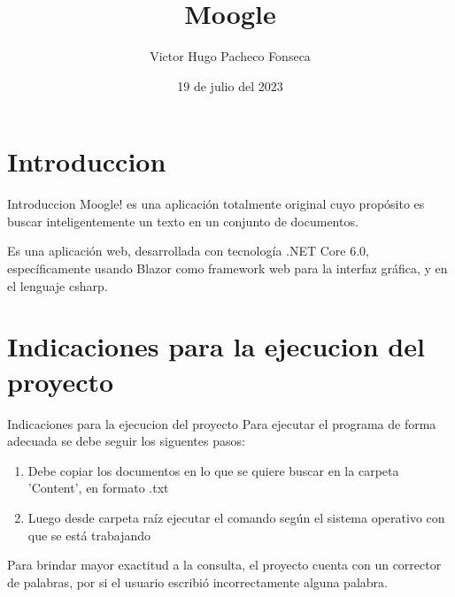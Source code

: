 \documentclass{beamer}
\title{Moogle}
\author{Victor Hugo Pacheco Fonseca}
\date{19 de julio del 2023}
\institute[UH]{Universidad de La Habana\\Matcom}
\begin{document}
	\begin{frame}[plain]
		\maketitle
	\end{frame}
	
	\section{Introduccion}
	\begin{frame}{Introduccion}
		Moogle! es una aplicación totalmente original cuyo propósito es buscar inteligentemente un texto en un conjunto de documentos.
		
		Es una aplicación web, desarrollada con tecnología .NET Core 6.0, específicamente usando Blazor como framework web para la interfaz gráfica, y en el lenguaje csharp.
	\end{frame}
	\section{Indicaciones para la ejecucion del proyecto}
	\begin{frame}{Indicaciones para la ejecucion del proyecto}
		Para ejecutar el programa de forma adecuada se debe seguir los siguentes
		pasos:
			\begin{enumerate}
			\item Debe copiar los documentos en lo que se quiere buscar en la carpeta 'Content', en formato .txt
			\item Luego desde carpeta raíz ejecutar el comando según el sistema operativo con que se está
			trabajando
		\end{enumerate}
			Para brindar mayor exactitud a la consulta, el proyecto cuenta con un corrector de palabras, por
		si el usuario escribió incorrectamente alguna palabra.
	\end{frame}
\end{document}
